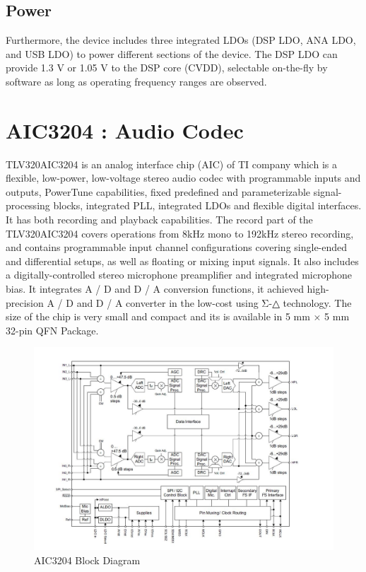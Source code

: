 \subsection{Power} Furthermore, the device includes three integrated LDOs (DSP LDO, ANA LDO, and USB LDO) to power different sections of the device. The DSP LDO can provide 1.3 V or 1.05 V to the DSP core (CVDD), 
selectable on-the-fly by software as long as operating frequency ranges are observed. 


\section{AIC3204 : Audio Codec}
TLV320AIC3204 is an analog interface chip (AIC) of TI company which is a flexible, low-power, low-voltage stereo audio codec with programmable inputs and outputs, PowerTune capabilities, fixed predefined and parameterizable signal-processing blocks, integrated PLL, integrated LDOs and flexible digital interfaces.  It has both recording and playback capabilities. The record part of the TLV320AIC3204 covers operations from 8kHz mono to 192kHz stereo recording, and contains programmable input channel configurations covering single-ended and differential setups, as well as floating or mixing input signals. It also includes a digitally-controlled stereo microphone preamplifier and integrated microphone bias. It integrates A / D and D / A conversion functions, it achieved high-precision A / D and D / A converter in the low-cost using Σ-△ technology. The size of the chip is very small and compact and its is available in  5 mm × 5 mm 32-pin QFN Package. 

\begin{figure}[h]
	\centering
	\includegraphics[scale = 0.5 ]{AIC3204.JPG}
	\caption{AIC3204 Block Diagram\label{aic3204}}
\end{figure}

